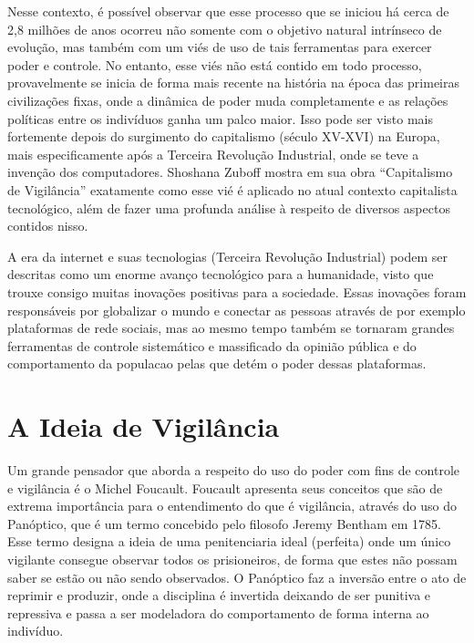 \documentclass[
	12pt,
	openright,
	twoside,
	a4paper,
	english,
	french,
	spanish,
	brazil
]{abntex2}
\begin{document}
  Nesse contexto, é possível observar que esse processo que se iniciou há cerca
  de 2,8 milhões de anos ocorreu não somente com o objetivo natural intrínseco
  de evolução, mas também com um viés de uso de tais ferramentas para exercer
  poder e controle. No entanto, esse viés não está contido em todo processo,
  provavelmente se inicia de forma mais recente na história na época das
  primeiras civilizações fixas, onde a dinâmica de poder muda completamente e as
  relações políticas entre os indivíduos ganha um palco maior. Isso pode ser
  visto mais fortemente depois do surgimento do capitalismo (século XV-XVI) na
  Europa, mais especificamente após a Terceira Revolução Industrial, onde se
  teve a invenção dos computadores. Shoshana Zuboff mostra em sua obra
  ``Capitalismo de Vigilância'' exatamente como esse vié é aplicado no atual
  contexto capitalista tecnológico, além de fazer uma profunda análise à
  respeito de diversos aspectos contidos nisso.

  A era da internet e suas tecnologias (Terceira Revolução Industrial) podem ser
  descritas como um enorme avanço tecnológico para a humanidade, visto que
  trouxe consigo muitas inovações positivas para a sociedade. Essas inovações
  foram responsáveis por globalizar o mundo e conectar as pessoas através de por
  exemplo plataformas de rede sociais, mas ao mesmo tempo também se tornaram
  grandes ferramentas de controle sistemático e massificado da opinião pública e
  do comportamento da populacao pelas que detém o poder dessas plataformas.

  \chapter{A Ideia de Vigilância}

  Um grande pensador que aborda a respeito do uso do poder com fins de controle
  e vigilância é o Michel Foucault. Foucault apresenta seus conceitos que são de
  extrema importância para o entendimento do que é vigilância, através do uso do
  Panóptico, que é um termo concebido pelo filosofo Jeremy Bentham em 1785. Esse
  termo designa a ideia de uma penitenciaria ideal (perfeita) onde um único
  vigilante consegue observar todos os prisioneiros, de forma que estes não
  possam saber se estão ou não sendo observados. O Panóptico faz a inversão
  entre o ato de reprimir e produzir, onde a disciplina é invertida deixando de
  ser punitiva e repressiva e passa a ser modeladora do comportamento de forma
  interna ao indivíduo.


  \postextual

  
\end{document}
